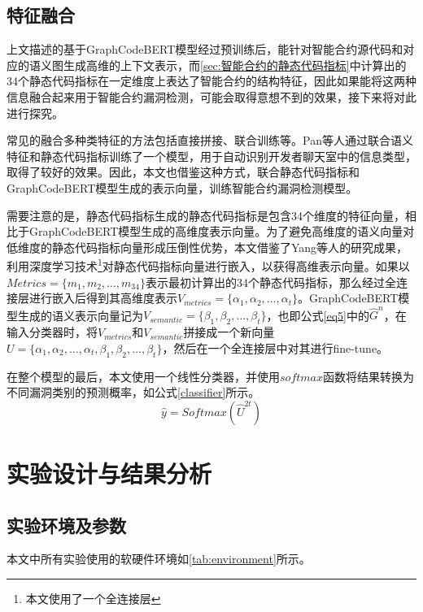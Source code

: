\subsection{特征融合}
\label{sec:特征融合}
上文描述的基于GraphCodeBERT模型经过预训练后，能针对智能合约源代码和对应的语义图生成高维的上下文表示，而\autoref{sec:智能合约的静态代码指标}中计算出的34个静态代码指标在一定维度上表达了智能合约的结构特征，因此如果能将这两种信息融合起来用于智能合约漏洞检测，可能会取得意想不到的效果，接下来将对此进行探究。

常见的融合多种类特征的方法包括直接拼接、联合训练等。Pan等人\cite{pan2021}通过联合语义特征和静态代码指标训练了一个模型，用于自动识别开发者聊天室中的信息类型，取得了较好的效果。因此，本文也借鉴这种方式，联合静态代码指标和GraphCodeBERT模型生成的表示向量，训练智能合约漏洞检测模型。

需要注意的是，静态代码指标生成的静态代码指标是包含34个维度的特征向量，相比于GraphCodeBERT模型生成的高维度表示向量。为了避免高维度的语义向量对低维度的静态代码指标向量形成压倒性优势，本文借鉴了Yang等人\cite{yang2015}的研究成果，利用深度学习技术\footnote{本文使用了一个全连接层}对静态代码指标向量进行嵌入，以获得高维表示向量。如果以$Metrics=\{m_1,m_2,\ldots,m_{34}\}$表示最初计算出的34个静态代码指标，那么经过全连接层进行嵌入后得到其高维度表示$V_{metrics}=\{\alpha_1,\alpha_2,\ldots,\alpha_t\}$。GraphCodeBERT模型生成的语义表示向量记为$V_{semantic}=\{\beta_1,\beta_2,\ldots,\beta_t\}$，也即公式\eqref{eq5}中的$\hat{G}^n$，在输入分类器时，将$V_{metrics}$和$V_{semantic}$拼接成一个新向量$U=\{\alpha_1,\alpha_2,\ldots,\alpha_t,\beta_1,\beta_2,\ldots,\beta_t\}$，然后在一个全连接层中对其进行fine-tune。

在整个模型的最后，本文使用一个线性分类器，并使用$softmax$函数将结果转换为不同漏洞类别的预测概率，如公式\eqref{classifier}所示。
\begin{equation}
\hat{y}=Softmax(\hat{U}^{2t}) \label{classifier}
\end{equation}
\section{实验设计与结果分析}
\label{sec:实验设计与结果分析}


\subsection{实验环境及参数}
\label{sec:实验环境及参数}
本文中所有实验使用的软硬件环境如\autoref{tab:environment}所示。

